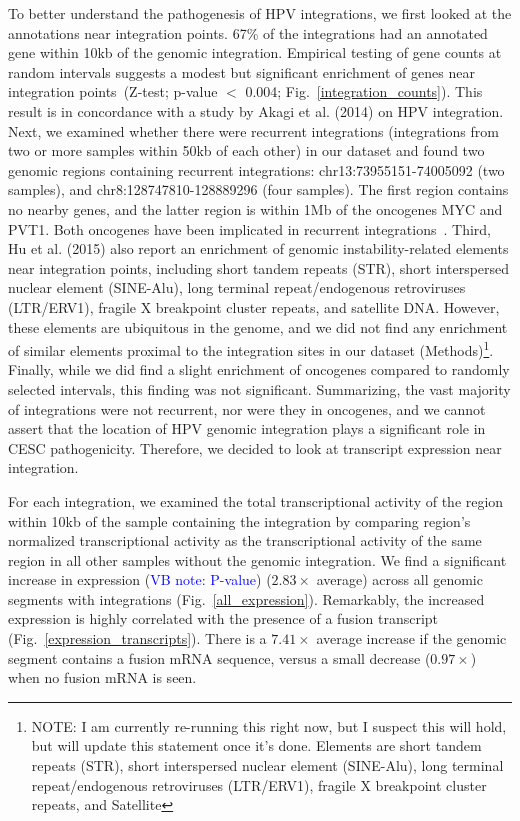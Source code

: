 \documentclass[11pt]{article}
\def\VB#1{{\textcolor{blue}{VB note: #1}}}
\begin{document}
To better understand the pathogenesis of HPV integrations, we first
looked at the annotations near integration points. 67\% of the
integrations had an annotated gene within 10kb of the genomic
integration. Empirical testing of gene counts at random intervals
suggests a modest but significant enrichment of genes near integration
points~(Z-test; p-value $<$ 0.004; Fig.~\ref{integration_counts}).
This result is in concordance with a study by Akagi et al. (2014) on
HPV integration. Next, we examined whether there were recurrent
integrations (integrations from two or more samples within 50kb of
each other) in our dataset and found two genomic regions containing
recurrent integrations: chr13:73955151-74005092 (two samples), and
chr8:128747810-128889296 (four samples).  The first region contains no
nearby genes, and the latter region is within 1Mb of the oncogenes MYC
and PVT1. Both oncogenes have been implicated in recurrent
integrations~\cite{Hu2015}. Third, Hu et al. (2015) also report an
enrichment of genomic instability-related elements near integration
points, including short tandem repeats (STR), short interspersed
nuclear element (SINE-Alu), long terminal repeat/endogenous
retroviruses (LTR/ERV1), fragile X breakpoint cluster repeats, and
satellite DNA. However, these elements are ubiquitous in the genome,
and we did not find any enrichment of similar elements proximal to the
integration sites in our dataset (Methods)\footnote{NOTE: I am
  currently re-running this right now, but I suspect this will hold,
  but will update this statement once it's done.  Elements are short
  tandem repeats (STR), short interspersed nuclear element (SINE-Alu),
  long terminal repeat/endogenous retroviruses (LTR/ERV1), fragile X
  breakpoint cluster repeats, and Satellite}.  Finally, while we did
find a slight enrichment of oncogenes compared to randomly selected
intervals, this finding was not significant. Summarizing, the vast
majority of integrations were not recurrent, nor were they in
oncogenes, and we cannot assert that the location of HPV genomic
integration plays a significant role in CESC pathogenicity. Therefore,
we decided to look at transcript expression near integration.

For each integration, we examined the total transcriptional activity
of the region within 10kb of the sample containing the integration by
comparing region's normalized transcriptional activity as the
transcriptional activity of the same region in all other samples
without the genomic integration.  We find a significant increase in
expression (\VB{P-value}) ($2.83\times$ average) across all genomic
segments with integrations (Fig.~\ref{all_expression}).  Remarkably,
the increased expression is highly correlated with the presence of a
fusion transcript (Fig.~\ref{expression_transcripts}).  There is a
$7.41\times$ average increase if the genomic segment contains a fusion
mRNA sequence, versus a small decrease ($0.97\times$) when no fusion
mRNA is seen.
\end{document}
